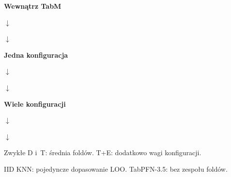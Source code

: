 \begin{minipage}[t]{0.31\linewidth}\centering\textbf{Wewnątrz TabM}\par\medskip
{}\par\smallskip$\downarrow$\par\smallskip{}\par\smallskip$\downarrow$\par\smallskip{}\end{minipage}
\hfill
\begin{minipage}[t]{0.31\linewidth}\centering\textbf{Jedna konfiguracja}\par\medskip
{}\par\smallskip$\downarrow$\par\smallskip{}\par\smallskip$\downarrow$\par\smallskip{}\end{minipage}
\hfill
\begin{minipage}[t]{0.31\linewidth}\centering\textbf{Wiele konfiguracji}\par\medskip
{}\par\smallskip$\downarrow$\par\smallskip{}\par\smallskip$\downarrow$\par\smallskip{}\end{minipage}\par\medskip Zwykłe D i~T: średnia foldów. T+E: dodatkowo wagi konfiguracji.\par IID KNN: pojedyncze dopasowanie LOO. TabPFN-3.5: bez zespołu foldów.
